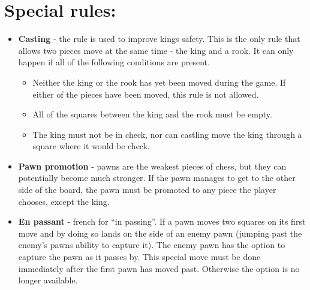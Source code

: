 \documentclass{article}
\begin{document}
\section{Special rules:}
\begin{itemize}

\item \textbf{Casting} - the rule is used to improve kings safety.  This is the only rule that allows two pieces move at the same time - the king and a rook. It can only happen if all of the following conditions are present.

\begin{itemize}
   \item Neither the king or the rook has yet been moved during the game. If either of the pieces have been moved, this rule is not allowed. 
   \item All of the squares between the king and the rook must be empty.
   \item The king must not be in check, nor can castling move the king through a square where it would be check. 
   \end{itemize}

\item \textbf{Pawn promotion} - pawns are the weakest pieces of chess, but they can potentially become much stronger. If the pawn manages to get to the other side of the board, the pawn must be promoted to any piece the player chooses, except the king. 

\item \textbf{En passant} - french for “in passing”. If a pawn moves two squares on its first move and by doing so lands on the side of an enemy pawn (jumping past the enemy’s pawns ability to capture it). The enemy pawn has the option to capture the pawn as it passes by. This special move must be done immediately after the first pawn has moved past. Otherwise the option is no longer available. 


\end{itemize}
\end{document}
